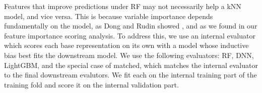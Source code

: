 
Features that improve predictions under RF may not necessarily help a kNN model, and vice versa. This is because variable importance depends fundamentally on the model, as Dong and Rudin showed \citep{Dong2020}, and as we found in our feature importance scoring analysis. To address this, we use an internal evaluator which scores each base representation on its own with a model whose inductive bias best fits the downstream model. We use the following evaluators: RF, DNN, LightGBM, and the special case of matched, which matches the internal evaluator to the final downstream evalutors. We fit each on the internal training part of the training fold and score it on the internal validation part.


